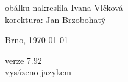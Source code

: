 \vspace*{\fill}
\hspace{10mm}obálku nakreslila Ivana Vlčková\\
korektura: Jan Brzobohatý\\
\begin{otherlanguage}{czech}
Brno, \today\\
\end{otherlanguage}
verze 7.92\\
vysázeno jazykem \LaTeXe
\vspace{2cm}
\newpage
